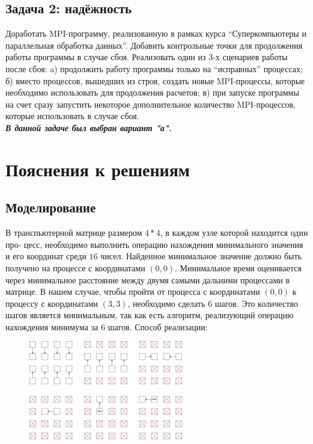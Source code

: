\documentclass[a4paper]{article}
\begin{document}
\subsection{Задача 2: надёжность}
Доработать MPI-программу, реализованную в рамках курса “Суперкомпьютеры и параллельная обработка данных”. Добавить контрольные точки для продолжения работы программы в случае сбоя. Реализовать один из 3-х сценариев работы после сбоя: a) продолжить работу программы только на “исправных” процессах; б) вместо процессов, вышедших из строя, создать новые MPI-процессы, которые необходимо использовать для продолжения расчетов; в) при запуске программы на счет сразу запустить некоторое дополнительное количество MPI-процессов, которые использовать в случае сбоя.\\
\textit{\textbf{В данной задаче был выбран вариант "а".}}
\newpage

\section{Пояснения к решениям}
\subsection{Моделирование}
В транспьютерной матрице размером $4*4$, в каждом узле которой находится один про-
цесс, необходимо выполнить операцию нахождения минимального значения и его координат среди $16$ чисел. Найденное минимальное значение должно быть получено
на процессе с координатами $(0,0)$.
Минимальное время оценивается через минимальное расстояние между двумя самыми дальними процессами в матрице. В нашем случае, чтобы пройти от процесса с
координатами $(0, 0)$ к процессу с координатами $(3, 3)$, необходимо сделать $6$ шагов. Это
количество шагов является минимальным, так как есть алгоритм, реализующий операцию нахождения минимума за $6$ шагов. Способ реализации:

\begin{figure}[htbp]
  \centering
  \includegraphics[width=0.6\textwidth]{graph}
\end{figure}
\end{document}
